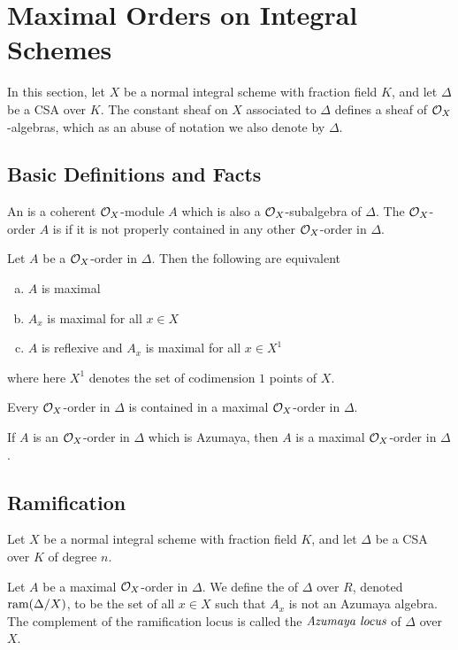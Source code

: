 \section{Maximal Orders on Integral Schemes}
In this section, let $X$ be a normal integral scheme with fraction field $K$, and let $\Delta$ be a CSA over $K$.  The constant sheaf on $X$ associated to $\Delta$ defines a sheaf of $\mathcal{O}_X$-algebras, which as an abuse of notation we also denote by $\Delta$.
\subsection{Basic Definitions and Facts}
\begin{defn}
An  is a coherent $\mathcal{O}_X$-module $A$ which is also a $\mathcal{O}_X$-subalgebra of $\Delta$.  The $\mathcal{O}_X$-order $A$ is  if it is not properly contained in any other $\mathcal{O}_X$-order in $\Delta$.
\end{defn}

\begin{prop}
Let $A$ be a $\mathcal{O}_X$-order in $\Delta$.  Then the following are equivalent
\begin{enumerate}[(a)]
\item  $A$ is maximal
\item  $A_x$ is maximal for all $x\in X$
\item  $A$ is reflexive and $A_x$ is maximal for all $x\in X^1$
\end{enumerate}
where here $X^1$ denotes the set of codimension $1$ points of $X$.
\end{prop}

\begin{prop}
Every $\mathcal{O}_X$-order in $\Delta$ is contained in a maximal $\mathcal{O}_X$-order in $\Delta$.
\end{prop}

\begin{prop}
If $A$ is an $\mathcal{O}_X$-order in $\Delta$ which is Azumaya, then $A$ is a maximal $\mathcal{O}_X$-order in $\Delta$.
\end{prop}

\subsection{Ramification}
Let $X$ be a normal integral scheme with fraction field $K$, and let $\Delta$ be a CSA over $K$ of degree $n$.
\begin{defn}
Let $A$ be a maximal $\mathcal{O}_X$-order in $\Delta$.  We define the  of $\Delta$ over $R$, denoted $\textnormal{ram}(\Delta/X)$, to be the set of all $x\in X$ such that $A_x$ is not an Azumaya algebra.  The complement of the ramification locus is called the $\textit{Azumaya locus}$ of $\Delta$ over $X$.
\end{defn}


